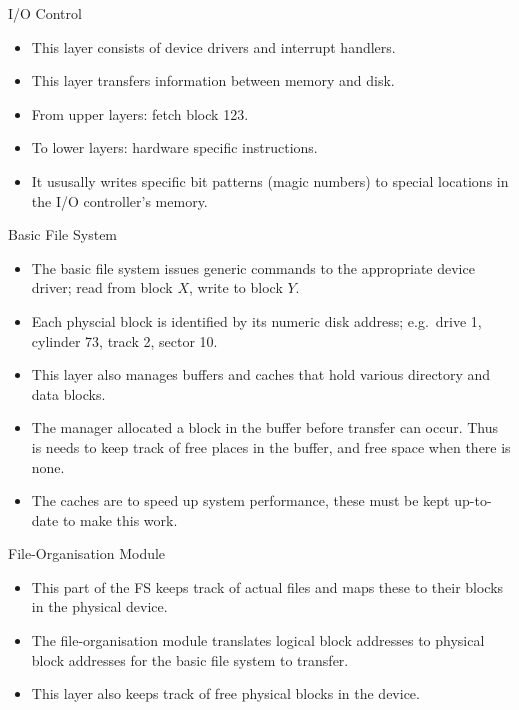 \documentclass{beamer}
\begin{document}
\begin{frame}{\insertsubsectionhead}{I/O Control}
  \begin{itemize}
    \item This layer consists of device drivers and interrupt handlers.

    \item This layer transfers information between memory and disk.

    \item From upper layers: fetch block 123.

    \item To lower layers: hardware specific instructions.

    \item It ususally writes specific bit patterns (magic numbers) to special 
      locations in the I/O controller's memory.

  \end{itemize}
\end{frame}

\begin{frame}{\insertsubsectionhead}{Basic File System}
  \begin{itemize}
    \item The basic file system issues generic commands to the appropriate 
      device driver; read from block \(X\), write to block \(Y\).

    \item Each physcial block is identified by its numeric disk address; e.g.\ 
      drive 1, cylinder 73, track 2, sector 10.

    \item This layer also manages buffers and caches that hold various 
      directory and data blocks.

    \item The manager allocated a block in the buffer before transfer can 
      occur.
      Thus is needs to keep track of free places in the buffer, and free space 
      when there is none.

    \item The caches are to speed up system performance, these must be kept 
      up-to-date to make this work.

  \end{itemize}
\end{frame}

\begin{frame}{\insertsubsectionhead}{File-Organisation Module}
  \begin{itemize}
    \item This part of the FS keeps track of actual files and maps these to 
      their blocks in the physical device.

    \item The file-organisation module translates logical block addresses to 
      physical block addresses for the basic file system to transfer.

    \item This layer also keeps track of free physical blocks in the device.

  \end{itemize}
\end{frame}
\end{document}
